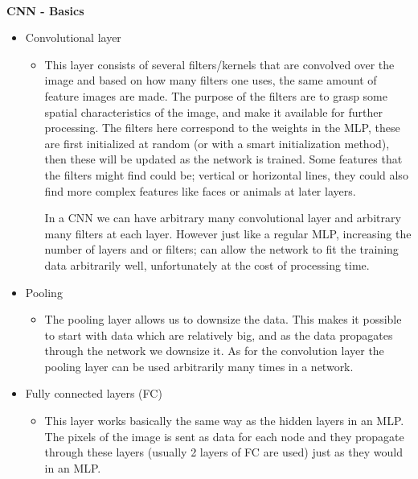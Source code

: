\documentclass[11pt,a4paper,UKenglish]{article}
\begin{document}
\noindent \\ \textbf{CNN - Basics}
\begin{itemize}
 \item{Convolutional layer}
 \begin{itemize}
  \item{This layer consists of several filters/kernels that are convolved over
  the image and based on how many filters one uses, the same amount of feature
  images are made. The purpose of the filters are to grasp some spatial
  characteristics of the image, and make it available for further processing.
  The filters here correspond to the weights in the MLP, these are first
  initialized at random (or with a smart initialization method), then these
  will be updated as the network is trained. Some features that the filters
  might find could be; vertical or horizontal lines, they could also find more
  complex features like faces or animals at later layers. \par
  In a CNN we can have arbitrary many convolutional layer and arbitrary many
  filters at each layer. However just like a regular MLP, increasing the
  number of layers and or filters; can allow the network to fit the training
  data arbitrarily well, unfortunately at the cost of processing time.}
 \end{itemize}
 \item{Pooling}
 \begin{itemize}
  \item{The pooling layer allows us to downsize the data. This makes it
  possible to start with data which are relatively big, and as the data propagates
  through the network we downsize it. As for the convolution layer the pooling
  layer can be used arbitrarily many times in a network.}
 \end{itemize}
 \item{Fully connected layers (FC)}
 \begin{itemize}
  \item{This layer works basically the same way as the hidden layers in an MLP.
  The pixels of the image is sent as data for each node and they propagate
  through these layers (usually 2 layers of FC are used) just as they would in
  an MLP.}
 \end{itemize}
\end{itemize}
\end{document}
